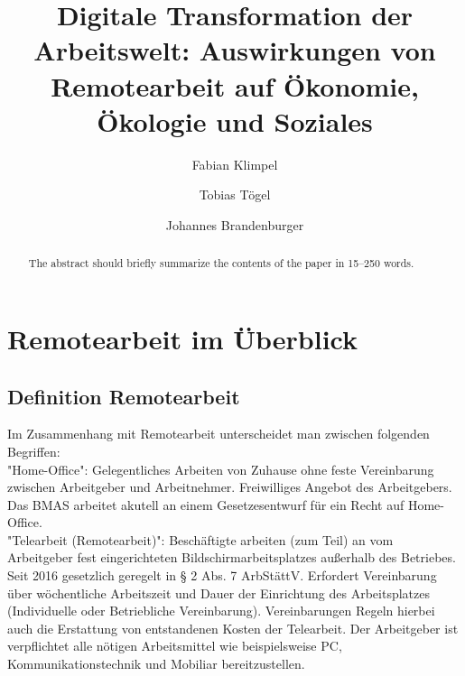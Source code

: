 \documentclass[runningheads]{llncs}
\begin{document}
\title{Digitale Transformation der Arbeitswelt: Auswirkungen von Remotearbeit auf Ökonomie, Ökologie und Soziales}


\author{Fabian Klimpel\orcidID{} \and
Tobias Tögel\orcidID{} \and
Johannes Brandenburger\orcidID{}}
%


\maketitle

\begin{abstract}
The abstract should briefly summarize the contents of the paper in
15--250 words.


\end{abstract}

\section{Remotearbeit im Überblick}

\subsection{Definition Remotearbeit}

Im Zusammenhang mit Remotearbeit unterscheidet man zwischen folgenden Begriffen:\\ 

"Home-Office": Gelegentliches Arbeiten von Zuhause ohne feste Vereinbarung zwischen Arbeitgeber und Arbeitnehmer\cite{Lenz}. Freiwilliges Angebot des Arbeitgebers\cite{Lenz}. Das BMAS arbeitet akutell an einem Gesetzesentwurf für ein Recht auf Home-Office\cite{Lenz}.\\ 

"Telearbeit (Remotearbeit)": Beschäftigte arbeiten (zum Teil) an vom Arbeitgeber fest eingerichteten Bildschirmarbeitsplatzes außerhalb des Betriebes. Seit 2016 gesetzlich geregelt in § 2 Abs. 7 ArbStättV\cite{bundestag}. Erfordert Vereinbarung über wöchentliche Arbeitszeit und Dauer der Einrichtung des Arbeitsplatzes (Individuelle oder Betriebliche Vereinbarung)\cite{vbg}. Vereinbarungen Regeln hierbei auch die Erstattung von entstandenen Kosten der Telearbeit\cite{vbg}. Der Arbeitgeber ist verpflichtet alle nötigen Arbeitsmittel wie beispielsweise PC, Kommunikationstechnik und Mobiliar bereitzustellen\cite{vbg}.\\    
\end{document}
